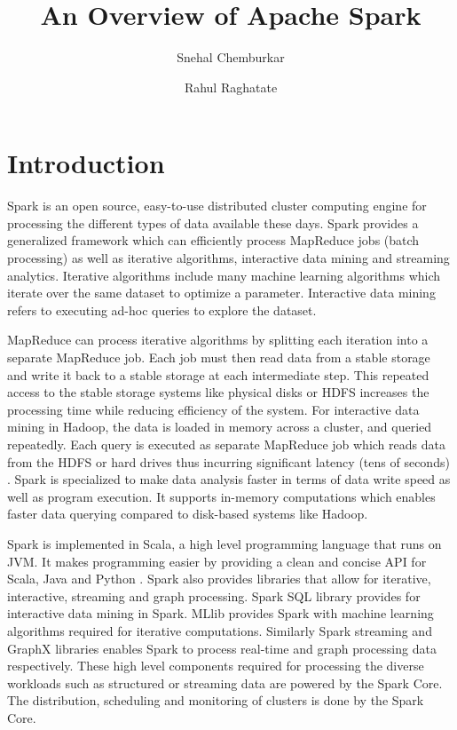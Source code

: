 \documentclass[9pt,twocolumn,twoside]{../../styles/osajnl}
\title{An Overview of Apache Spark}
\author[1]{Snehal Chemburkar}
\author[1]{Rahul Raghatate}
\affil[1]{School of Informatics and Computing, Bloomington, IN 47408,
  U.S.A.}
\affil[*]{Corresponding authors: snehchem@iu.edu, rraghtate@iu.edu}
\begin{document}
\maketitle
{}
  
\section{Introduction}

Spark is an open source, easy-to-use distributed cluster computing
engine for processing the different types of data available these
days. Spark provides a generalized framework which can efficiently
process MapReduce jobs (batch processing) as well as iterative
algorithms, interactive data mining and streaming analytics. Iterative
algorithms include many machine learning algorithms which iterate over
the same dataset to optimize a parameter. Interactive data mining
refers to executing ad-hoc queries to explore the dataset.

MapReduce can process iterative algorithms by splitting each iteration
into a separate MapReduce job. Each job must then read data from a
stable storage and write it back to a stable storage at each
intermediate step. This repeated access to the stable storage systems
like physical disks or HDFS increases the processing time while
reducing efficiency of the system. For interactive data mining in
Hadoop, the data is loaded in memory across a cluster, and queried
repeatedly. Each query is executed as separate MapReduce job which
reads data from the HDFS or hard drives thus incurring significant
latency (tens of seconds) \cite{paper-zaharia}.  Spark is specialized
to make data analysis faster in terms of data write speed as well as
program execution. It supports in-memory computations which enables
faster data querying compared to disk-based systems like Hadoop.

Spark is implemented in Scala, a high level programming language that
runs on JVM. It makes programming easier by providing a clean and
concise API for Scala, Java and Python \cite{paper-zaharia}. Spark
also provides libraries that allow for iterative, interactive,
streaming and graph processing. Spark SQL library provides for
interactive data mining in Spark. MLlib provides Spark with machine
learning algorithms required for iterative computations. Similarly
Spark streaming and GraphX libraries enables Spark to process
real-time and graph processing data respectively. These high level
components required for processing the diverse workloads such as
structured or streaming data are powered by the Spark Core. The
distribution, scheduling and monitoring of clusters is done by the
Spark Core.
\end{document}

